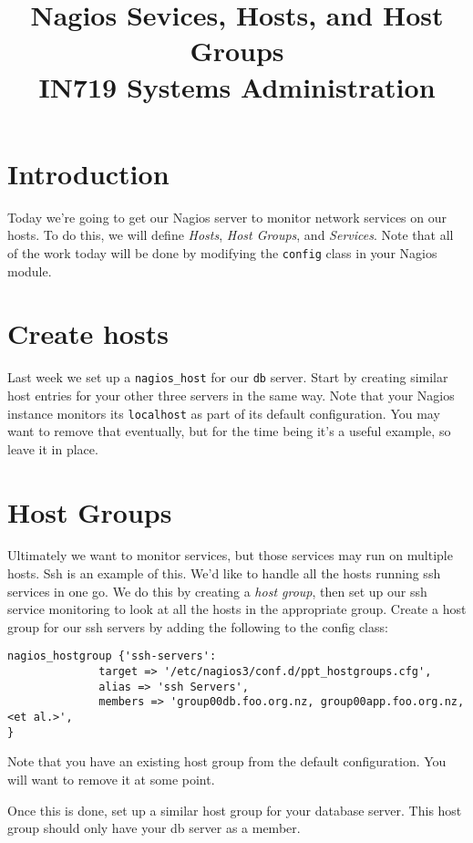 \documentclass{article}         %
\title{Nagios Sevices, Hosts, and Host Groups\\ IN719 Systems Administration}
\date{}                                                 %
\begin{document}
\maketitle


\section*{Introduction}
Today we're going to get our Nagios server to monitor network services on our hosts. To do this, we will define \emph{Hosts}, \emph{Host Groups}, and \emph{Services}. Note that all of the work today will be done by modifying the \texttt{config} class
in your Nagios module.

\section{Create hosts}
Last week we set up a \texttt{nagios\_host} for our \texttt{db} server. Start by creating similar host entries for your other three servers in the same way. Note that your Nagios instance monitors its \texttt{localhost} as part of its default configuration. You may want to remove that eventually, but for the time being it's a useful example, so leave it in place.

\section{Host Groups}
Ultimately we want to monitor services, but those services may run on multiple hosts. Ssh is an example of this. We'd like to handle all the hosts running ssh services in one go. We do this by creating a \emph{host group}, then set up our ssh service monitoring to look at all the hosts in the appropriate group. Create a host group for our ssh servers by adding the following to the config class:

\begin{verbatim}
nagios_hostgroup {'ssh-servers':
              target => '/etc/nagios3/conf.d/ppt_hostgroups.cfg',
              alias => 'ssh Servers',
              members => 'group00db.foo.org.nz, group00app.foo.org.nz, <et al.>',
}
\end{verbatim}

Note that you have an existing host group from the default configuration. You will want to remove it at some point.

Once this is done, set up a similar host group for your database server. This host group should only have your db server as a member.
\end{document}
